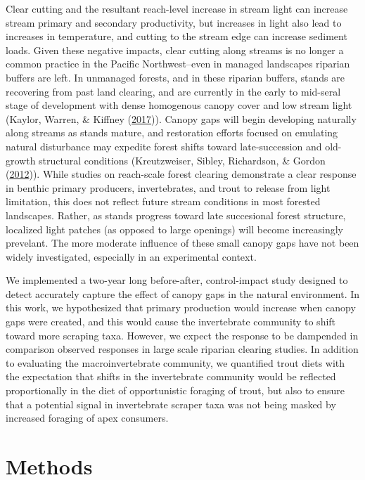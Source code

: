 \documentclass[double,12pt]{beavtex}
\begin{document}
  Clear cutting and the resultant reach-level increase in stream light can
  increase stream primary and secondary productivity, but increases in
  light also lead to increases in temperature, and cutting to the stream
  edge can increase sediment loads. Given these negative impacts, clear
  cutting along streams is no longer a common practice in the Pacific
  Northwest--even in managed landscapes riparian buffers are left. In
  unmanaged forests, and in these riparian buffers, stands are recovering
  from past land clearing, and are currently in the early to mid-seral
  stage of development with dense homogenous canopy cover and low stream
  light (Kaylor, Warren, \& Kiffney
  (\protect\hyperlink{ref-Kaylor2017FS}{2017})). Canopy gaps will begin
  developing naturally along streams as stands mature, and restoration
  efforts focused on emulating natural disturbance may expedite forest
  shifts toward late-succession and old-growth structural conditions
  (Kreutzweiser, Sibley, Richardson, \& Gordon
  (\protect\hyperlink{ref-Kreutzweiser2012}{2012})). While studies on
  reach-scale forest clearing demonstrate a clear response in benthic
  primary producers, invertebrates, and trout to release from light
  limitation, this does not reflect future stream conditions in most
  forested landscapes. Rather, as stands progress toward late succesional
  forest structure, localized light patches (as opposed to large openings)
  will become increasingly prevelant. The more moderate influence of these
  small canopy gaps have not been widely investigated, especially in an
  experimental context.
  
  We implemented a two-year long before-after, control-impact study
  designed to detect accurately capture the effect of canopy gaps in the
  natural environment. In this work, we hypothesized that primary
  production would increase when canopy gaps were created, and this would
  cause the invertebrate community to shift toward more scraping taxa.
  However, we expect the response to be dampended in comparison observed
  responses in large scale riparian clearing studies. In addition to
  evaluating the macroinvertebrate community, we quantified trout diets
  with the expectation that shifts in the invertebrate community would be
  reflected proportionally in the diet of opportunistic foraging of trout,
  but also to ensure that a potential signal in invertebrate scraper taxa
  was not being masked by increased foraging of apex consumers.
  
  \chapter*{Methods}\label{methods}
  
\end{document}
